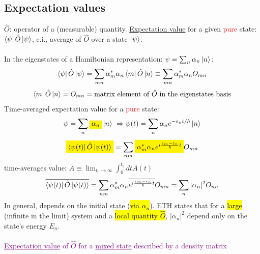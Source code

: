 \documentclass[10pt]{article}
\begin{document}
\subsection{Expectation values}
$\hat O$: operator of a (measurable) quantity. \ul{Expectation value} for a given \textcolor{red}{pure} state: $\bra{\psi}\hat O \ket{\psi}$, e.i., average of $\hat O$ over a state $\ket{\psi}$.\\ \\
\noindent In the eigenstates of a Hamiltonian representation: $\psi = \sum_n \alpha_n \ket{n}$:
$$
\bra{\psi}\hat O \ket{\psi} = \sum_{mn} \alpha_m^\ast \alpha_n \bra{m}\hat O \ket{n} \equiv \sum_{mn} \alpha_m^\ast \alpha_n O_{mn}
$$
$$
\bra{m}\hat O \ket{n} = O_{mn} = \text{matrix element of $\hat O$ in the eigenstates basis}
$$
Time-averaged expectation value for a \textcolor{red}{pure} state:
$$
\psi = \sum_n \colorbox{yellow}{$\alpha_n$} \ket{n} \ \Rightarrow \psi(t) = \sum_n \alpha_n e^{-\varepsilon_n t/\hbar}\ket{n}
$$
$$
\colorbox{yellow}{$\bra{\psi(t)}\hat O \ket{\psi(t)}$} = \sum_{nm} \colorbox{yellow}{$\alpha_m^\ast \alpha_n e^{i\frac{\varepsilon_m - \varepsilon_n}{\hbar}t}$} O_{mn}
$$
time-averages value: $\overline A \equiv \lim_{t_0 \to \infty} \int_0^{t_0} dt A(t)$
$$
\overline{\bra{\psi(t)}\hat O \ket{\psi(t)}} = \sum_{nm}\alpha_m^\ast \alpha_n \overline{e^{i\frac{\varepsilon_m - \varepsilon_n}{\hbar}t}}O_{mn} = \sum_n |\alpha_n|^2 O_{nn}
$$
In general, depends on the initial state (\hl{via $\alpha_n$}). ETH states that for a \hl{large} (infinite in the limit) system and a \hl{local quantity $\hat O$}, $|\alpha_n|^2$ depend only on the state's energy $E_n$. \\ \\

\textcolor{purple}{\ul{Expectation value} of $\hat O$ for a \ul{mixed state} described by a density matrix}\\ \\
\end{document}
